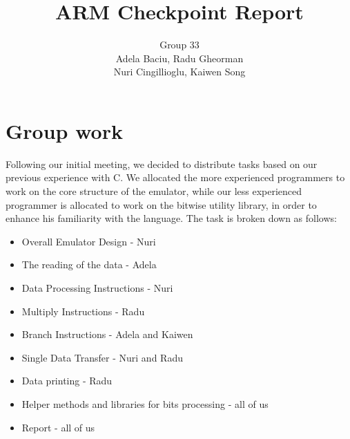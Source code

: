 \documentclass[10pt,a4paper]{article}
\title{ARM Checkpoint Report}
\author{Group 33\\Adela Baciu, Radu Gheorman\\ Nuri Cingillioglu, Kaiwen Song}
\begin{document}
\maketitle 
\vspace{10mm}
\section{Group work}

Following our initial meeting, we decided to distribute tasks based on our previous experience with C. We allocated the more experienced programmers to work on the core structure of the emulator, while our less experienced programmer is allocated to work on the bitwise utility library, in order to enhance his familiarity with the language. The task is broken down as follows:

\begin{itemize}

\item Overall Emulator Design                                                  - Nuri

\item The reading of the data                                                    - Adela

\item Data Processing Instructions                                           - Nuri

\item Multiply Instructions                                                         - Radu

\item Branch Instructions                                                          - Adela and Kaiwen

\item Single Data Transfer                                                        - Nuri and Radu

\item Data printing                                                                    - Radu

\item Helper methods and libraries for bits processing            - all of us

\item Report                                                                             - all of us 

\end{itemize}
\end{document}
